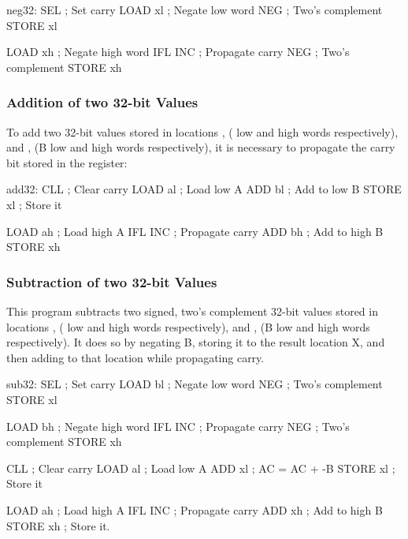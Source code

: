 \begin{cftasmcode}
neg32:  SEL         ; Set carry
        LOAD xl     ; Negate low word
        NEG         ; Two's complement
        STORE xl

        LOAD xh     ; Negate high word
        IFL INC     ; Propagate carry
        NEG         ; Two's complement
        STORE xh
\end{cftasmcode}

\subsubsection{Addition of two 32-bit Values}

To add two 32-bit values stored in locations ,  (\A{} low
and high words respectively), and ,  (B low and high
words respectively), it is necessary to propagate the carry bit
stored in the \Lreg{} register:

\begin{cftasmcode}
add32:  CLL         ; Clear carry
        LOAD al     ; Load low A
        ADD bl      ; Add to low B
        STORE xl    ; Store it

        LOAD ah     ; Load high A
        IFL INC     ; Propagate carry
        ADD bh      ; Add to high B
        STORE xh
\end{cftasmcode}


\subsubsection{Subtraction of two 32-bit Values}

This program subtracts two signed, two's complement 32-bit values
stored in locations ,  (\A{} low and high words
respectively), and ,  (B low and high words
respectively). It does so by negating B, storing it to the result
location X, and then adding \A{} to that location while propagating
carry.

\begin{cftasmcode}
sub32:  SEL         ; Set carry
        LOAD bl     ; Negate low word
        NEG         ; Two's complement
        STORE xl

        LOAD bh     ; Negate high word
        IFL INC     ; Propagate carry
        NEG         ; Two's complement
        STORE xh

        CLL         ; Clear carry
        LOAD al     ; Load low A
        ADD xl      ; AC = AC + -B
        STORE xl    ; Store it

        LOAD ah     ; Load high A
        IFL INC     ; Propagate carry
        ADD xh      ; Add to high B
        STORE xh    ; Store it.
\end{cftasmcode}


